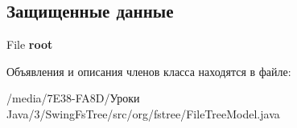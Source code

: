 \subsection*{Защищенные данные}
\begin{DoxyCompactItemize}
\item 
\hypertarget{classorg_1_1fstree_1_1_file_tree_model_a2308e3f92af6236230691dc1771fc471}{
File {\bfseries root}}
\label{classorg_1_1fstree_1_1_file_tree_model_a2308e3f92af6236230691dc1771fc471}

\end{DoxyCompactItemize}


Объявления и описания членов класса находятся в файле:\begin{DoxyCompactItemize}
\item 
/media/7E38-\/FA8D/Уроки Java/3/SwingFsTree/src/org/fstree/FileTreeModel.java\end{DoxyCompactItemize}
